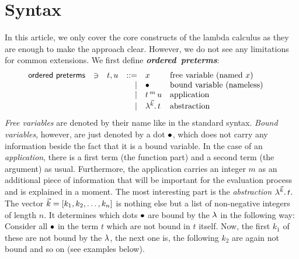 \documentclass[submission,copyright,creativecommons]{eptcs}
\newcommand{\define}[1]{\mbox{\textbf{\textit{#1}}}}
\begin{document}

\section{Syntax}
\label{sec:syntax}

In this article, we only cover the core constructs of the lambda calculus as they are enough to make the approach clear. However, we do not see any limitations for common extensions. We first define \define{ordered preterms}:
\[
\begin{array}{lllrll@{\qquad}}
\mathsf{ordered \ preterms}       & \ni & t,u & ::= & x & \mbox{free variable (named $x$)} \\
			                   &&& \mid & \ovar & \mbox{bound variable (nameless)} \\
			                   &&& \mid & \ApO t m u & \mbox{application} \\
			                   &&& \mid & \LaO {\vec k} t & \mbox{abstraction} \\
\end{array}
\]
\emph{Free variables} are denoted by their name like in the standard syntax. \emph{Bound variables}, however, are just denoted by a dot $\mathord{\bullet}$, which does not carry any information beside the fact that it is a bound variable. 
In the case of an \emph{application}, there is a first term (the function part) and a second term (the argument) as usual. 
Furthermore, the application carries an integer $m$ as an additional piece of information that will be important for the evaluation process and is explained 
in a moment.
The most interesting part is the \emph{abstraction} $\lambda ^{\vec k} . \, t$. The vector $\vec k = [k_1, k_2, \ldots, k_n]$ is nothing else but a list of non-negative  integers of length $n$. It determines which dots $\mathord{\bullet}$ are bound by the $\lambda$ in the following way: Consider all $\mathord{\bullet}$ in the term $t$ which are not bound in $t$ itself. Now, the first $k_1$ of these are not bound by the $\lambda$, the next one is, the following $k_2$ are again not bound and so on (see examples below). 
\end{document}
